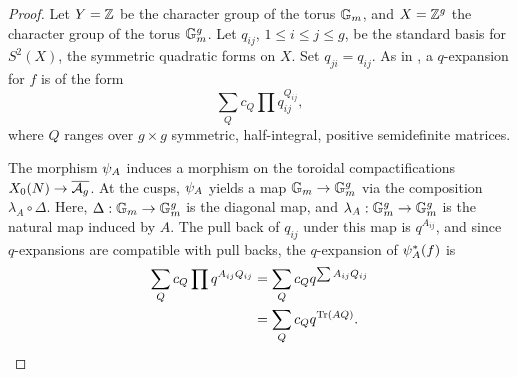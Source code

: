 \documentclass{amsart}
\begin{document}
\begin{proof}
  Let $Y = \mathbb{Z}$ be the character group of the torus $\mathbb{G}_m$, and $X = \mathbb{Z}^g$ the character group of the torus $\mathbb{G}_m^g$. Let $q_{ij}$, $1 \leq i \leq j \leq g$, be the standard basis for $S^2(X)$, the symmetric quadratic forms on $X$. Set $q_{ji} = q_{ij}$. As in \cite[Section V.1]{faltings1990degeneration}, a $q$-expansion for $f$ is of the form
  \[
    \sum_Q c_Q \prod q_{ij}^{Q_{ij}},
  \]
  where $Q$ ranges over $g \times g$ symmetric, half-integral, positive semidefinite matrices.

  The morphism $\psi_{A}$ induces a morphism on the toroidal compactifications $X_0(N) \to \overline{\mathcal{A}_g}$. At the cusps, $\psi_{A}$ yields a map $\mathbb{G}_m \to \mathbb{G}_m^g$ via the composition $\lambda_A \circ \Delta$. Here, $\Delta: \mathbb{G}_m \to \mathbb{G}_m^g$ is the diagonal map, and $\lambda_A: \mathbb{G}_m^g \to \mathbb{G}_m^g$ is the natural map induced by $A$. The pull back of $q_{ij}$ under this map is $q^{A_{ij}}$, and since $q$-expansions are compatible with pull backs, the $q$-expansion of $\psi_{A}^*(f)$ is
  \begin{align*}
    \sum_Q c_Q \prod q^{A_{ij}Q_{ij}} &= \sum_Q c_Q q^{\sum A_{ij}Q_{ij}} \\
    &= \sum_Q c_Q q^{\operatorname{Tr}(AQ)}.
  \end{align*}
\end{proof}
\end{document}
